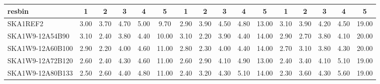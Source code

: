 \begin{table}[H]
{{\begin{tabular}{|lccccc||ccccc||ccccc|}
 resbin  &1 & 2 & 3 & 4 & 5 & 1 & 2 & 3 & 4 & 5 & 1 & 2 & 3 & 4 & 5 \\ \hline
SKA1REF2 & 3.00 \cellcolor{blue!53.00} & 3.70 \cellcolor{red!60.00} & 4.70 \cellcolor{green!60.00} & 5.00 \cellcolor{orange!60.00} & 9.70 \cellcolor{purple!18.00} & 2.90 \cellcolor{blue!48.00} & 3.90 \cellcolor{red!60.00} & 4.50 \cellcolor{green!60.00} & 4.80 \cellcolor{orange!42.00} & 13.00 \cellcolor{purple!18.00} & 3.10 \cellcolor{blue!60.00} & 3.90 \cellcolor{red!60.00} & 4.20 \cellcolor{green!51.60} & 4.50 \cellcolor{orange!29.20} & 19.00 \cellcolor{purple!18.00}\\ \hline 
SKA1W9-12A54B90 & 3.10 \cellcolor{blue!60.00} & 2.40 \cellcolor{red!23.60} & 3.80 \cellcolor{green!18.00} & 4.40 \cellcolor{orange!18.00} & 10.00 \cellcolor{purple!27.69} & 3.10 \cellcolor{blue!60.00} & 2.20 \cellcolor{red!18.00} & 3.90 \cellcolor{green!18.00} & 4.40 \cellcolor{orange!18.00} & 14.00 \cellcolor{purple!60.00} & 2.90 \cellcolor{blue!49.50} & 2.70 \cellcolor{red!18.00} & 3.80 \cellcolor{green!18.00} & 4.10 \cellcolor{orange!18.00} & 20.00 \cellcolor{purple!60.00}\\ \hline 
SKA1W9-12A60B100 & 2.90 \cellcolor{blue!46.00} & 2.20 \cellcolor{red!18.00} & 4.00 \cellcolor{green!27.33} & 4.60 \cellcolor{orange!32.00} & 11.00 \cellcolor{purple!60.00} & 2.80 \cellcolor{blue!42.00} & 2.30 \cellcolor{red!20.47} & 4.00 \cellcolor{green!25.00} & 4.40 \cellcolor{orange!18.00} & 14.00 \cellcolor{purple!60.00} & 2.70 \cellcolor{blue!39.00} & 3.10 \cellcolor{red!32.00} & 3.80 \cellcolor{green!18.00} & 4.30 \cellcolor{orange!23.60} & 20.00 \cellcolor{purple!60.00}\\ \hline 
SKA1W9-12A72B120 & 2.60 \cellcolor{blue!25.00} & 2.40 \cellcolor{red!23.60} & 4.30 \cellcolor{green!41.33} & 4.60 \cellcolor{orange!32.00} & 11.00 \cellcolor{purple!60.00} & 2.60 \cellcolor{blue!30.00} & 2.90 \cellcolor{red!35.29} & 4.10 \cellcolor{green!32.00} & 4.90 \cellcolor{orange!48.00} & 13.00 \cellcolor{purple!18.00} & 2.40 \cellcolor{blue!23.25} & 3.40 \cellcolor{red!42.50} & 4.10 \cellcolor{green!43.20} & 5.10 \cellcolor{orange!46.00} & 19.00 \cellcolor{purple!18.00}\\ \hline 
SKA1W9-12A80B133 & 2.50 \cellcolor{blue!18.00} & 2.60 \cellcolor{red!29.20} & 4.40 \cellcolor{green!46.00} & 4.80 \cellcolor{orange!46.00} & 11.00 \cellcolor{purple!60.00} & 2.40 \cellcolor{blue!18.00} & 3.20 \cellcolor{red!42.71} & 4.30 \cellcolor{green!46.00} & 5.10 \cellcolor{orange!60.00} & 14.00 \cellcolor{purple!60.00} & 2.30 \cellcolor{blue!18.00} & 3.60 \cellcolor{red!49.50} & 4.30 \cellcolor{green!60.00} & 5.60 \cellcolor{orange!60.00} & 19.00 \cellcolor{purple!18.00}\\ \hline 

\end{tabular}}}
\end{table}
